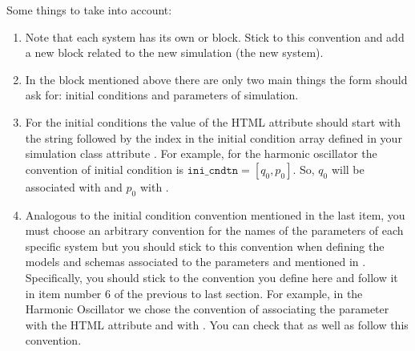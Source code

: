 \documentclass[a4paper,landscape,10pt,english]{sphinxmanual}
\begin{document}
Some things to take into account:
\begin{enumerate}
%
\item {} 
Note that each system has its own  or  block. Stick to this
convention and add a new block related to the new simulation (the new system).

\item {} 
In the  block mentioned above there are only two main things the form
should ask for: initial conditions and parameters of simulation.

\item {} 
For the initial conditions the value of the HTML attribute  should start
with the string  followed by the index in the initial condition
array defined in your simulation class attribute .
For example, for the harmonic oscillator the convention of initial condition
is \(\texttt{ini_cndtn} = [q_0, p_0]\). So, \(q_0\) will be associated
with  and \(p_0\) with .

\item {} 
Analogous to the initial condition convention mentioned in the last
item, you must choose an arbitrary convention for the names of the parameters
of each specific system but you should stick to this convention when defining
the models and schemas associated to the parameters and mentioned in
{\hyperref[\detokenize{code_docs/new_simulation:new-simulation-schemas}]{}}.
Specifically, you should stick to the convention you define here and follow
it in item number 6 of the previous to last section. For example, in the
Harmonic Oscillator we chose the convention of associating the parameter
 with the HTML attribute  and  with
. You can check that
 as well as
{\hyperref[\detokenize{code_docs/simulation_API.controller:simulation_API.controller.schemas.params_mapping_HO}]{}} follow this
convention.

\end{enumerate}
\end{document}
